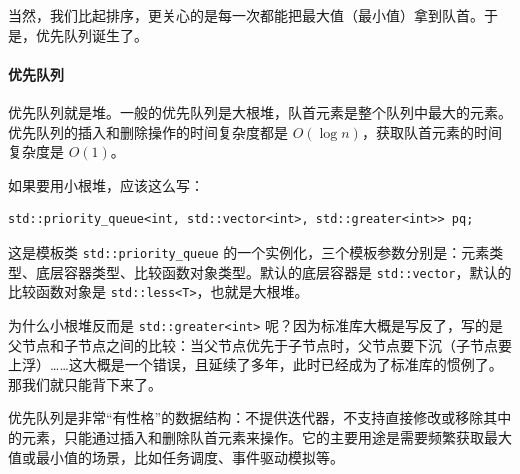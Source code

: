 当然，我们比起排序，更关心的是每一次都能把最大值（最小值）拿到队首。于是，优先队列诞生了。

\paragraph{优先队列}

优先队列就是堆。一般的优先队列是大根堆，队首元素是整个队列中最大的元素。优先队列的插入和删除操作的时间复杂度都是 $O(\log n)$，获取队首元素的时间复杂度是 $O(1)$。

如果要用小根堆，应该这么写：
\begin{verbatim}
std::priority_queue<int, std::vector<int>, std::greater<int>> pq;
\end{verbatim}
这是模板类 \verb|std::priority_queue| 的一个实例化，三个模板参数分别是：元素类型、底层容器类型、比较函数对象类型。默认的底层容器是 \verb|std::vector|，默认的比较函数对象是 \verb|std::less<T>|，也就是大根堆。

为什么小根堆反而是 \verb|std::greater<int>| 呢？因为标准库大概是写反了，写的是父节点和子节点之间的比较：当父节点优先于子节点时，父节点要下沉（子节点要上浮）……这大概是一个错误，且延续了多年，此时已经成为了标准库的惯例了。那我们就只能背下来了。

优先队列是非常“有性格”的数据结构：不提供迭代器，不支持直接修改或移除其中的元素，只能通过插入和删除队首元素来操作。它的主要用途是需要频繁获取最大值或最小值的场景，比如任务调度、事件驱动模拟等。

